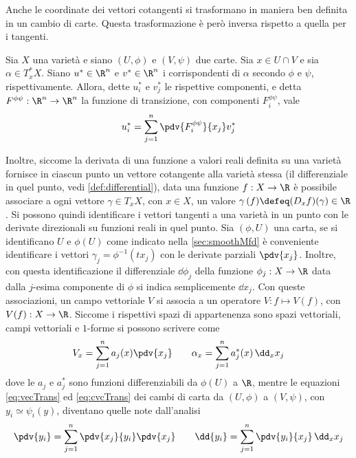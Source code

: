 Anche le coordinate dei vettori cotangenti si trasformano in maniera ben definita in un cambio di carte. Questa trasformazione è però inversa rispetto a quella per i tangenti.
\begin{theorem} 
  Sia $X$ una varietà e siano $(U,\phi)$ e $(V,\psi)$ due carte. Sia $x \in  U \cap V$ e sia $\alpha \in  T_x^* X$. Siano $u^* \in \R^{n}$ e $v^* \in  \R^{n}$ i corrispondenti di $\alpha$ secondo $\phi$ e $\psi$, rispettivamente. Allora, dette $u^*_i$ e $v^*_j$ le rispettive componenti, e detta $F^{\phi\psi}:\R^{n} \to \R^{n}$ la funzione di transizione, con componenti $F^{\phi \psi}_i$, vale \begin{equation} \label{eq:cvcTrans}
  u^*_i = \sum_{j=1}^n \pdv{F^{\phi \psi}_i}{x_j} v^*_j
  \end{equation} 
\end{theorem}

Inoltre, siccome la derivata di una funzione a valori reali definita su una varietà fornisce in ciascun punto un vettore cotangente alla varietà stessa (il differenziale in quel punto, vedi \autoref{def:differential}), data una funzione $f:X \to \R$ è possibile associare a ogni vettore $\gamma \in T_x X$, con $x \in X$, un valore $\gamma\,(f) \defeq (D_x f) (\gamma) \in \R$. Si possono quindi identificare i vettori tangenti a una varietà in un punto con le derivate direzionali su funzioni reali in quel punto. Sia $(\phi,U)$ una carta, se si identificano $U$ e $\phi(U)$ come indicato nella \autoref{sec:smoothMfd} è conveniente identificare i vettori $\gamma_j = \phi^{-1}(tx_j)$ con le derivate parziali $\pdv{x_j}$. Inoltre, con questa identificazione il differenziale $\dd \phi_j$ della funzione $\phi_j:X\to \R$ data dalla $j$-esima componente di $\phi$ si indica semplicemente $\dd x_j$. Con queste associazioni, un campo vettoriale $V$ si associa a un operatore $V: f \mapsto V(f)$, con $V(f): X \to \R$. Siccome i rispettivi spazi di appartenenza sono spazi vettoriali, campi vettoriali e $1$-forme si possono scrivere come \begin{equation*}
V_x = \sum_{j=1}^{n} a_j(x) \pdv{x_j} \qquad \alpha_x = \sum_{j=1}^{n} a^*_j(x)\, \dd_x x_j
\end{equation*} 
dove le $a_j$ e $a^*_j$ sono funzioni differenziabili da $\phi(U)$ a $\R$, mentre le equazioni \ref{eq:vecTrans} ed \ref{eq:cvcTrans} dei cambi di carta da $(U, \phi)$ a $(V, \psi)$, con $y_i \simeq \psi_i(y)$, diventano quelle note dall'analisi \begin{equation*}
\pdv{y_i} = \sum_{j=1}^{n} \pdv{x_j}{y_i} \pdv{x_j} \qquad \dd{y_i} = \sum_{j=1}^{n} \pdv{y_i}{x_j}\, \dd_x x_j
\end{equation*} 

